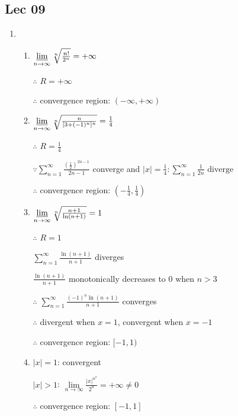\subsection{Lec 09}
    \begin{enumerate}[1]
    \item
        \begin{enumerate}[(1)]
        \item
        $\varliminf\limits_{n\rightarrow{\infty}}\sqrt[n]{\frac{n!}{2^n}}=+\infty$
        \par $\therefore$ $R=+\infty$
        \par $\therefore$ convergence region: $(-\infty,+\infty)$

        \item
        $\varliminf\limits_{n\rightarrow{\infty}}\sqrt[n]{\frac{n}{[3+(-1)^n]^n}}=\frac{1}{4}$
        \par $\therefore$ $R=\frac{1}{4}$
        \par $\because \sum \limits_{n=1}^{\infty} \frac{\left(\frac{1}{2}\right)^{2 n-1}}{2 n-1}$ converge and $|x|=\frac{1}{4}: \sum \limits_{n=1}^{\infty} \frac{1}{2 n} \text { diverge }$
        \par $\therefore$ convergence region: $(-\frac{1}{4},\frac{1}{4})$

        \item
        $\varliminf\limits_{n\rightarrow{\infty}} \sqrt[n]{\frac{n+1}{ \ln (n+1)}}=1$
        \par $\therefore$ $R=1$
        \par $\sum\limits_{n=1}^\infty \frac{ \ln (n+1)}{n+1}$ diverges
        \par $\frac{ \ln (n+1)}{n+1}$ monotonically decreases to $0$ when $n>3$
        \par $\therefore$ $\sum\limits_{n=1}^\infty \frac{(-1)^n  \ln (n+1)}{n+1}$ converges
        \par $\therefore$ divergent when $x=1$, convergent when $x=-1$
        \par $\therefore$ convergence region: $[-1,1)$

        \item
        $|x|=1$: convergent
        \par $|x|>1$: $\lim\limits_{n\rightarrow{\infty}} \frac{|x|^{n^2}}{2^n}=+\infty \neq 0$
        \par $\therefore$ convergence region: $[-1,1]$


\end{enumerate}
\end{enumerate}
